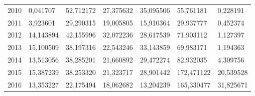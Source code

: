 \begin{table}
\begin{tabular}{p{1cm}p{2cm}p{2cm}p{2cm}p{2cm}p{2cm}p{2cm}}
 2010 &                               0,041707 &    52,712172 &                                    27,375632 &                             35,095506 &  55,761181 &          0,228191 \\
 2011 &                               3,923601 &    29,290315 &                                    19,005805 &                             15,910364 &  29,937777 &          0,452374 \\
 2012 &                              14,143894 &    42,155996 &                                    32,072236 &                             28,617539 &  71,903112 &          1,127397 \\
 2013 &                              15,100509 &    38,197316 &                                    22,543246 &                             33,143859 &  69,983171 &          1,194363 \\
 2014 &                              13,513056 &    38,285201 &                                    21,660892 &                             29,472274 &  82,932035 &          4,309756 \\
 2015 &                              15,387239 &    38,253320 &                                    21,323717 &                             28,901442 & 172,471122 &         20,539528 \\
 2016 &                              13,353227 &    22,175494 &                                    18,062682 &                             13,204239 & 165,330477 &         31,825671 \\
\bottomrule
\end{tabular}
\end{table}
